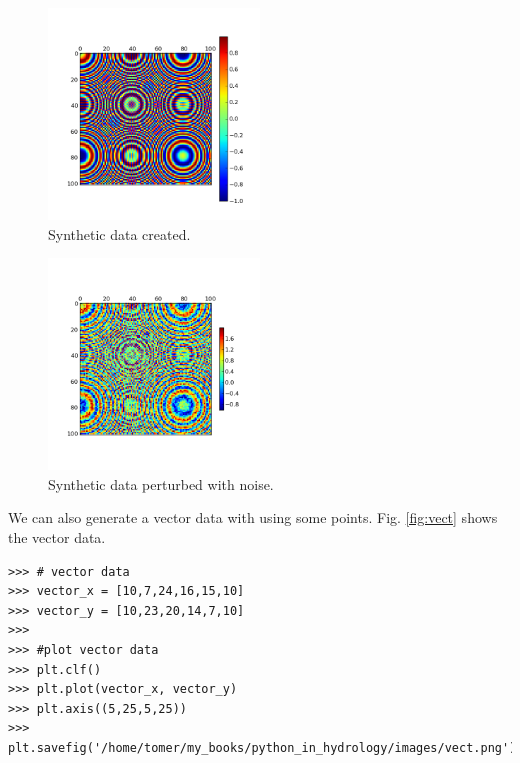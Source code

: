 \documentclass[10pt]{book}
\begin{document}
{\beforefig
\begin{figure}[h!]
  \centering
    \includegraphics[width=0.5\textwidth]{images/spatial_data.png}
  \caption{Synthetic data created.}
   \label{fig:spatial_data}
\end{figure}
\afterfig

\beforefig
\begin{figure}[h!]
  \centering
    \includegraphics[width=0.5\textwidth]{images/spatial_data_noisy.png}
  \caption{Synthetic data perturbed with noise.}
   \label{fig:spatial_data_noisy}
\end{figure}
\afterfig

We can also generate a vector data with using some points. Fig. \ref{fig:vect} shows the vector data. 

\beforeverb \begin{verbatim}
>>> # vector data
>>> vector_x = [10,7,24,16,15,10]
>>> vector_y = [10,23,20,14,7,10]
>>> 
>>> #plot vector data
>>> plt.clf()
>>> plt.plot(vector_x, vector_y)
>>> plt.axis((5,25,5,25))
>>> plt.savefig('/home/tomer/my_books/python_in_hydrology/images/vect.png')
\end{verbatim} \afterverb

}
\end{document}
